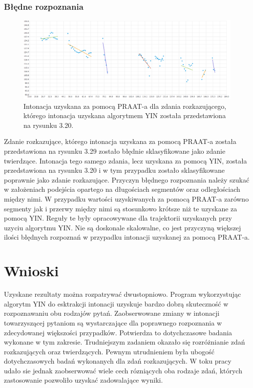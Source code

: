 \documentclass[a4paper,12 pt]{report}
\begin{document}
\subsection{Błędne rozpoznania}
\begin{figure}[h]
\centering
\includegraphics[scale=0.55]{rozkaz_1_praat_zle.png}
\caption{Intonacja uzyskana za pomocą PRAAT-a dla zdania rozkazującego, którego intonacja uzyskana algorytmem YIN została przedstawiona na rysunku 3.20.}
\end{figure}
\FloatBarrier
Zdanie rozkazujące, którego intonacja uzyskana za pomocą PRAAT-a została przedstawiona na rysunku 3.29 zostało błędnie sklasyfikowane jako zdanie twierdzące. Intonacja tego samego zdania, lecz uzyskana za pomocą YIN, została przedstawiona na rysunku 3.20 i w tym przypadku zostało sklasyfikowane poprawnie jako zdanie rozkazujące. Przyczyn błędnego rozpoznania należy szukać w założeniach podejścia opartego na długościach segmentów oraz odległościach między nimi. W przypadku wartości uzyskiwanych za pomocą PRAAT-a zarówno segmenty jak i przerwy między nimi są stosunkowo krótsze niż te uzyskane za pomocą YIN. Reguły te były opracowywane dla trajektorii uzyskanych przy uzyciu algorytmu YIN. Nie są doskonale skalowalne, co jest przyczyną większej ilości błędnych rozpoznań w przypadku intonacji uzyskanej za pomocą PRAAT-a.  
\chapter{Wnioski}
Uzyskane rezultaty można rozpatrywać dwustopniowo. Program wykorzystując algorytm YIN do esktrakcji intonacji uzyskuje bardzo dobrą skuteczność w rozpoznawaniu obu rodzajów pytań. Zaobserwowane zmiany w intonacji towarzyszącej pytaniom są wystarczające dla poprawnego rozpoznania w zdecydowanej większości przypadków. Potwierdza to dotychczasowe badania wykonane w tym zakresie. 
Trudniejszym zadaniem okazało się rozróżnianie zdań rozkazujących oraz twierdzących. Pewnym utrudnieniem była ubogość dotychczasowych badań wykonanych dla zdań rozkazujących. W toku pracy udało sie jednak zaobserwować wiele cech rózniących oba rodzaje zdań, których zastosowanie pozwoliło uzyskać zadowalające wyniki.
\end{document}
